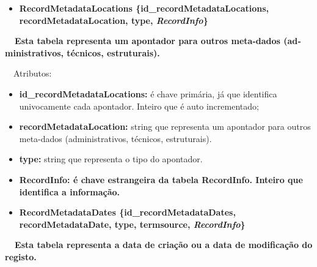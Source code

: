 \documentclass[letterpaper]{article}
\newcommand\textstyleStrongEmphasis[1]{\textbf{#1}}
\newcommand\liststyleLi{%
\renewcommand\labelitemi{{\textbullet}}
\renewcommand\labelitemii{[27A2?]}
\renewcommand\labelitemiii{{\textbullet}}
\renewcommand\labelitemiv{{\textbullet}}
}
\newcommand\liststyleLvi{%
\renewcommand\labelitemi{[27A2?]}
\renewcommand\labelitemii{[27A2?]}
\renewcommand\labelitemiii{[27A2?]}
\renewcommand\labelitemiv{[27A2?]}
}
\begin{document}
\bigskip

\liststyleLi
\begin{itemize}
\item {\bfseries
RecordMetadataLocations\textmd{
\{}\textmd{id\_recordMetadataLocations}\textmd{,
recordMetadataLocation, type, }\textmd{\textit{RecordInfo}}\textmd{\}}}
\end{itemize}
{\bfseries
\foreignlanguage{english}{\textmd{\ \ Esta
}}\textstyleStrongEmphasis{\foreignlanguage{english}{\textmd{tabela}}}\foreignlanguage{english}{\textmd{
representa um apontador para outros meta-dados (administrativos,
t\'ecnicos, estruturais)}}\foreignlanguage{english}{\textmd{.}}}


\bigskip

{
\ \ Atributos:}

\liststyleLvi
\begin{itemize}
\item {
\textbf{id\_recordMetadataLocations}\textbf{:} \'e chave prim\'aria,
j\'a que identifica univocamente cada apontador. Inteiro que \'e auto
incrementado;}
\item {
\textbf{recordMetadataLocation:} string que representa um apontador para
outros meta-dados (administrativos, t\'ecnicos, estruturais).}
\item {
\textbf{type:} string que representa o tipo do apontador.}
\item {\bfseries
RecordInfo:\textmd{\textit{ }}\textmd{\'e chave estrangeira da tabela
RecordInfo. Inteiro que identifica a informa\c{c}\~ao.}}
\end{itemize}

\bigskip

\liststyleLi
\begin{itemize}
\item {\bfseries
RecordMetadataDates\textmd{ \{}\textmd{id\_recordMetadataDates}\textmd{,
recordMetadataDate, type, termsource,
}\textmd{\textit{RecordInfo}}\textmd{\}}}
\end{itemize}
{\bfseries
\foreignlanguage{english}{\textmd{\ \ Esta
}}\textstyleStrongEmphasis{\foreignlanguage{english}{\textmd{tabela}}}\foreignlanguage{english}{\textmd{
representa a data de cria\c{c}\~ao ou a data de modifica\c{c}\~ao do
registo}}\foreignlanguage{english}{\textmd{.}}}


\bigskip
\end{document}
